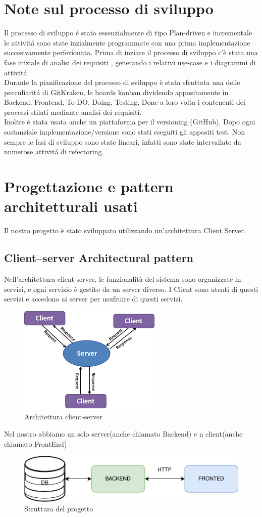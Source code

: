 \documentclass[a4paper,12pt,openany,oneside]{book}
\begin{document}
\section{Note sul processo di sviluppo }
Il processo di sviluppo é stato essenzialmente di tipo Plan-driven e incrementale  le attivitá sono state inzialmente programmate con una prima implementazione succesivamente perfezionata. Prima di inziare il processo di sviluppo c'è stata una fase iniziale di analisi dei requisiti , generando i relativi use-case e i diagrammi di attivitá.\\ Durante la pianificazione del processo di sviluppo è stata sfruttata una delle pecculiaritá di GitKraken, le  boards kanban dividendo appositamente in Backend, Frontend, To DO, Doing, Testing, Done a loro volta i contenenti dei processi stilati mediante analisi dei requisiti. \\Inoltre è stata usata anche un piattaforma per il versioning (GitHub). Dopo ogni sostanziale implementazione/versione sono stati eseguiti gli appositi test. Non sempre le fasi di sviluppo sono state lineari, infatti sono state intervallate da numerose attivitá di refectoring.

\section{Progettazione e pattern architetturali usati}
Il nostro progetto è stato sviluppato utilizzando un'architettura Client Server.
\subsection*{Client–server Architectural pattern}
Nell'architettura client server, le funzionalità del sistema sono organizzate in servizi, e ogni servizio è gestito da un server diverso. I Client sono utenti di questi servizi e accedono ai server per usufruire di questi servizi.
\begin{figure}[h] 
\centering
\includegraphics[width=0.3\columnwidth]{client-server.png} 
\caption{Architettura client-server}
\end{figure}
\newpage 
\noindent Nel nostro abbiamo un solo server(anche chiamato Backend) e n client(anche chiamato FrontEnd)
\begin{figure}[h] 
\centering
\includegraphics[width=0.6\columnwidth]{client-server2.png} 
\caption{Struttura del progetto}
\end{figure}
\end{document}
